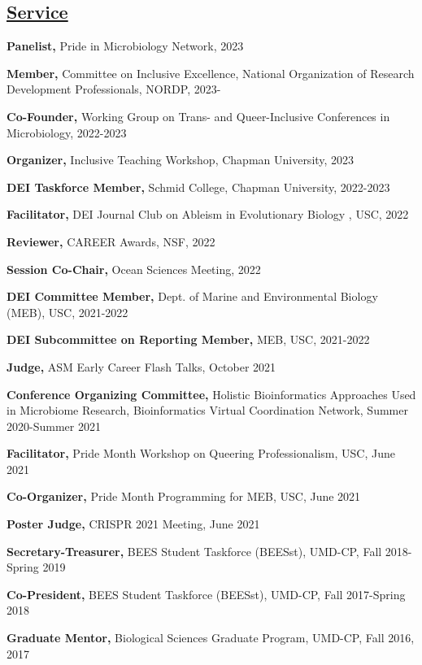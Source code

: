 \documentclass[]{res}
\begin{document}
\begin{resume}
\section{\underline{Service}} \vspace{2mm}

{\bf Panelist,} Pride in Microbiology Network, 2023

{\bf Member,} Committee on Inclusive Excellence, National Organization of Research Development Professionals, NORDP, 2023-

{\bf Co-Founder,} Working Group on Trans- and Queer-Inclusive Conferences in Microbiology, 2022-2023

{\bf Organizer,} {Inclusive Teaching Workshop}, Chapman University, 2023

{\bf DEI Taskforce Member,} {Schmid College}, Chapman University, 2022-2023

{\bf Facilitator,} DEI Journal Club on Ableism in Evolutionary Biology , USC, 2022

{\bf Reviewer,} CAREER Awards, NSF, 2022

{\bf Session Co-Chair,} {Ocean Sciences Meeting}, 2022

{\bf DEI Committee Member,} {Dept. of Marine and Environmental Biology (MEB)}, USC, 2021-2022

{\bf DEI Subcommittee on Reporting Member,} {MEB}, USC, 2021-2022

{\bf Judge,} ASM Early Career Flash Talks, October 2021

{\bf Conference Organizing Committee,} {Holistic Bioinformatics Approaches Used in Microbiome Research}, Bioinformatics Virtual Coordination Network, Summer 2020-Summer 2021

{\bf Facilitator,} {Pride Month Workshop on Queering Professionalism}, USC, June 2021

{\bf Co-Organizer,} {Pride Month Programming for MEB}, USC, June 2021


{\bf Poster Judge,} {CRISPR 2021 Meeting}, June 2021

{\bf Secretary-Treasurer,} {BEES Student Taskforce (BEESst)}, UMD-CP, Fall 2018-Spring 2019 %

{\bf Co-President,} {BEES Student Taskforce (BEESst)}, UMD-CP, Fall 2017-Spring 2018

{\bf Graduate Mentor,} {Biological Sciences Graduate Program}, UMD-CP, Fall 2016, 2017 %


\end{resume}
\end{document}
